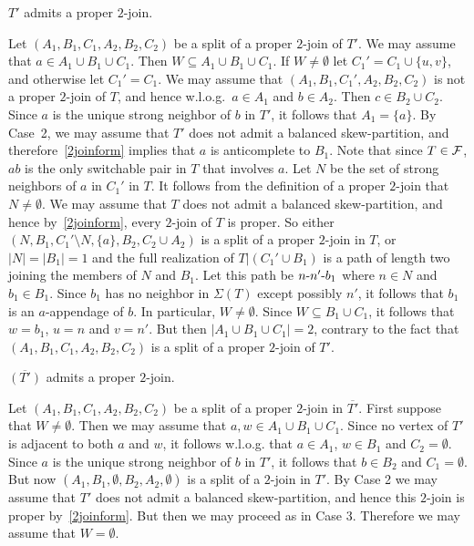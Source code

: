 \documentclass[11 pt] {article}
\def\d{\hbox{-}}
\begin{document}
 $T'$ admits a proper $2$-join.

Let $(A_1,B_1,C_1,A_2,B_2,C_2)$ be a split of a proper $2$-join of
$T'$. We may assume that $a \in A_1 \cup B_1 \cup C_1$. Then $W
\subseteq A_1 \cup B_1 \cup C_1$. If $W \neq \emptyset$ let $C_1'=C_1
\cup \{u,v\}$, and otherwise let $C_1'=C_1$. We may assume that
$(A_1,B_1,C_1',A_2,B_2,C_2)$ is not a proper $2$-join of $T$, and
hence w.l.o.g.\ $a \in A_1$ and $b \in A_2$. Then $c \in B_2 \cup
C_2$. Since $a$ is the unique strong neighbor of $b$ in $T'$, it
follows that $A_1=\{a\}$. By Case~2, we may assume that $T'$ does not
admit a balanced skew-partition, and therefore~\ref{2joinform} implies
that $a$ is anticomplete to $B_1$.  Note that since $T \in {\cal F}$,
$ab$ is the only switchable pair in $T$ that involves $a$.  Let $N$ be
the set of strong neighbors of $a$ in $C_1'$ in $T$. It follows from
the definition of a proper $2$-join that $N \neq \emptyset$.  We may
assume that $T$ does not admit a balanced skew-partition, and hence
by~\ref{2joinform}, every $2$-join of $T$ is proper.  So either $(N,B_1,
C_1' \setminus N,\{a\}, B_2, C_2 \cup A_2)$ is a split of a proper
$2$-join in $T$, or $|N|=|B_1|=1$ and the full realization of $T|(C_1'
\cup B_1)$ is a path of length two joining the members of $N$ and
$B_1$. Let this path be $n \d n' \d b_1$ where $n \in N$ and $b_1 \in
B_1$. Since $b_1$ has no neighbor in $\Sigma(T)$ except possibly $n'$,
it follows that $b_1$ is an $a$-appendage of $b$. In particular, $W
\neq \emptyset$. Since $W \subseteq B_1 \cup C_1$, it follows that
$w=b_1$, $u=n$ and $v=n'$. But then $|A_1 \cup B_1 \cup C_1|=2$,
contrary to the fact that $(A_1,B_1,C_1,A_2,B_2,C_2)$ is a split of a
proper $2$-join of $T'$.

 $\overline{(T')}$ admits a proper $2$-join.

Let $(A_1,B_1,C_1,A_2,B_2,C_2)$ be a split of a proper $2$-join in
$\overline{T'}$. First suppose that $W\neq \emptyset$. Then we may
assume that $a,w \in A_1 \cup B_1\cup C_1$. Since no vertex of $T'$ is
adjacent to both $a$ and $w$, it follows w.l.o.g. that $a\in A_1$, $w
\in B_1$ and $C_2=\emptyset$.  Since $a$ is the unique strong neighbor
of $b$ in $T'$, it follows that $b \in B_2$ and $C_1=\emptyset$.  But
now $(A_1,B_1,\emptyset , B_2, A_2, \emptyset)$ is a split of a
$2$-join in $T'$. By Case 2 we may assume that $T'$ does not admit a
balanced skew-partition, and hence this $2$-join is proper
by~\ref{2joinform}. But then we may proceed as in Case 3.  Therefore
we may assume that $W=\emptyset$.
\end{document}
